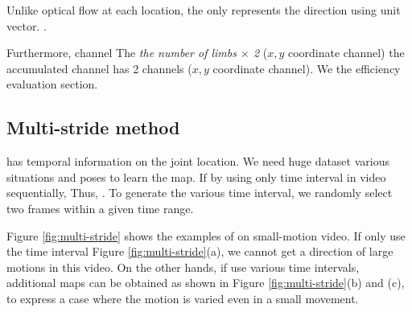 \documentclass[conference]{IEEEtran}
\begin{document}
Unlike optical flow \cite{horn1981determining}   at each location, the 
only represents the direction using unit vector. .


Furthermore,  
channel  The  \textit{ the number of limbs \(\times\) 2} ($x, y$ coordinate channel)  the accumulated channel has  2 channels ($x, y$ coordinate channel). We  the efficiency  evaluation section.



\subsection{Multi-stride method}


 has temporal information on the joint location. We need  huge dataset  various situations and poses to learn the map. If  by using only  time interval in video sequentially,  Thus, . To generate the various time interval, we randomly select two frames within a given time range.

Figure \ref{fig:multi-stride} shows the examples of 
on  small-motion video. If  only use the time interval  Figure \ref{fig:multi-stride}(a), we cannot get a direction of large motions in this video. On the other hands, if  use various time intervals, additional maps can be obtained as shown in Figure \ref{fig:multi-stride}(b) and (c), 
 to express a case where the motion is varied even in a small movement.
\end{document}
